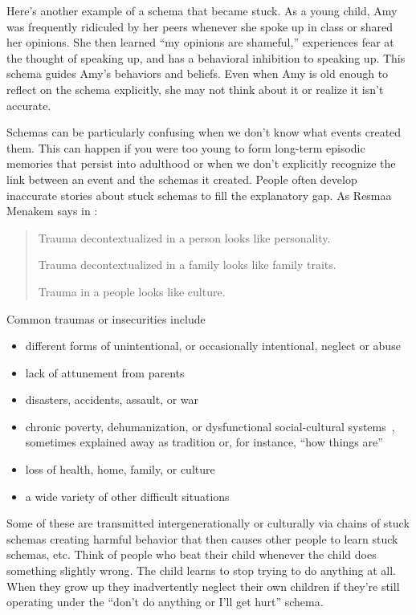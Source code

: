 \documentclass[11pt,oneside]{book}
\let\cite\parencite
\begin{document}
Here's another example of a schema that became stuck. As a young child, Amy was frequently ridiculed by her peers whenever she spoke up in class or shared her opinions. She then learned \enquote{my opinions are shameful,} experiences fear at the thought of speaking up, and has a behavioral inhibition to speaking up. This schema guides Amy's behaviors and beliefs. Even when Amy is old enough to reflect on the schema explicitly, she may not think about it or realize it isn't accurate.

Schemas can be particularly confusing when we don't know what events created them. This can happen if you were too young to form long-term episodic memories that persist into adulthood or when we don't explicitly recognize the link between an event and the schemas it created. People often develop inaccurate stories about stuck schemas to fill the explanatory gap. As Resmaa Menakem says in \textcite{menakemContext}:
\begin{quotation}
    Trauma decontextualized in a person looks like personality.
    
    Trauma decontextualized in a family looks like family traits.
    
    Trauma in a people looks like culture.
\end{quotation}

Common traumas or insecurities include
\begin{itemize}
    \item different forms of unintentional, or occasionally intentional, neglect or abuse
    \item lack of attunement from parents~\cite{brownAttachmentDisturbances}
    \item disasters, accidents, assault, or war
    \item chronic poverty, dehumanization, or dysfunctional social-cultural systems~\cite{roncaStructuralViolence}, sometimes explained away as tradition or, for instance, \enquote{how things are}
    \item loss of health, home, family, or culture
    \item a wide variety of other difficult situations
\end{itemize}

Some of these are transmitted intergenerationally or culturally via chains of stuck schemas creating harmful behavior that then causes other people to learn stuck schemas, etc. Think of people who beat their child whenever the child does something slightly wrong. The child learns to stop trying to do anything at all. When they grow up they inadvertently neglect their own children if they're still operating under the \enquote{don't do anything or I'll get hurt} schema.
\end{document}
